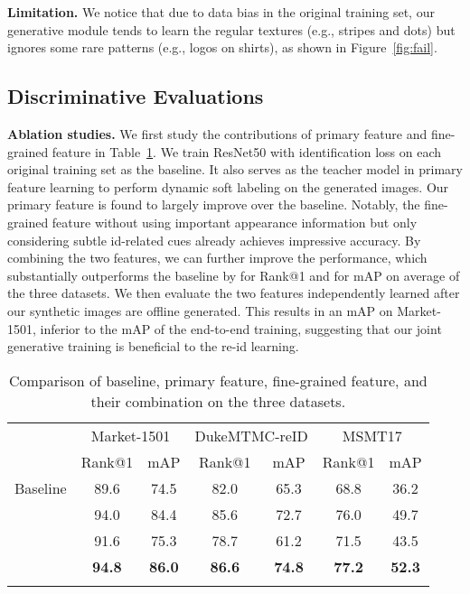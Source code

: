 \documentclass[10pt,twocolumn,letterpaper]{article}
\begin{document}
\textbf{Limitation.} 
We notice that due to data bias in the original training set, our generative module tends to learn the regular textures (e.g., stripes and dots) but ignores some rare patterns (e.g., logos on shirts), as shown in Figure~\ref{fig:fail}.  

\subsection{Discriminative Evaluations}
\textbf{Ablation studies.} 
We first study the contributions of primary feature and fine-grained feature in Table~\ref{table:ablation_s}. We train ResNet50 with identification loss on each original training set as the baseline. It also serves as the teacher model in primary feature learning to perform dynamic soft labeling on the generated images. Our primary feature is found to largely improve over the baseline. Notably, the fine-grained feature without using important appearance information but only considering subtle id-related cues already achieves impressive accuracy. By combining the two features, we can further improve the performance, which substantially outperforms the baseline by  for Rank@1 and  for mAP on average of the three datasets. We then evaluate the two features independently learned after our synthetic images are offline generated. This results in an  mAP on Market-1501, inferior to the  mAP of the end-to-end training, suggesting that our joint generative training is beneficial to the re-id learning. 

\begin{table}[t]
\small
\vspace{-.1in}
\caption{ 
Comparison of baseline, primary feature, fine-grained feature, and their combination on the three datasets.}
{
\label{table:ablation_s}
\setlength{\tabcolsep}{1pt}
\begin{tabular}{l|cc|cc|cc}
\shline
\multirow{2}{*}{Methods} & \multicolumn{2}{c|}{Market-1501} & \multicolumn{2}{c|}{DukeMTMC-reID} &\multicolumn{2}{c}{MSMT17}\\
& Rank@1 & mAP & Rank@1  & mAP & Rank@1  & mAP\\
\hline
Baseline & 89.6 & 74.5 & 82.0  & 65.3 & 68.8 & 36.2 \\
 & 94.0 & 84.4 & 85.6 & 72.7 &  76.0 & 49.7 \\
  & 91.6 & 75.3 & 78.7 & 61.2 & 71.5 & 43.5 \\
\hline
 & \textbf{94.8} & \textbf{86.0} & \textbf{86.6} & \textbf{74.8} & \textbf{77.2} & \textbf{52.3} \\
\shline
\end{tabular}}
\end{table}
\end{document}
